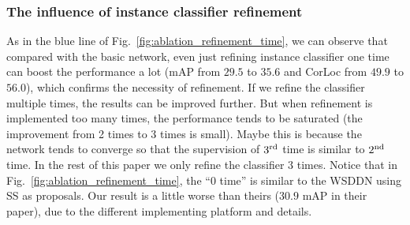 \documentclass[10pt,twocolumn,letterpaper]{article}
\def\methodname{OICR}
\begin{document}


\subsubsection{The influence of instance classifier refinement}
\label{sec:influence_lp}

As in the blue line of Fig.~\ref{fig:ablation_refinement_time}, we can observe that compared with the basic network, even just refining instance classifier one time can boost the performance a lot (mAP from $29.5$ to $35.6$ and CorLoc from $49.9$ to $56.0$), which confirms the necessity of refinement.
If we refine the classifier multiple times, the results can be improved further.
But when refinement is implemented too many times, the performance tends to be saturated (the improvement from 2 times to 3 times is small).
Maybe this is because the network tends to converge so that the supervision of $3^{\textup{rd}}$ time is similar to $2^{\textup{nd}}$ time.
In the rest of this paper we only refine the classifier $3$ times.
Notice that in Fig.~\ref{fig:ablation_refinement_time}, the ``0 time'' is similar to the WSDDN \cite{Ref:Bilen2016} using SS as proposals.
Our result is a little worse than theirs ($30.9$ mAP in their paper), due to the different implementing platform and details.
\end{document}
